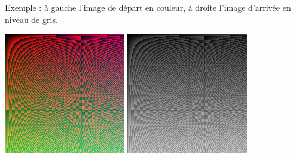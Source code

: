 \documentclass[11pt,class=report,crop=false]{standalone}
\begin{document}
\begin{activite}
\begin{enumerate}
Exemple : à gauche l'image de départ en couleur, à droite l'image d'arrivée en niveau de gris.
\begin{center}
\includegraphics[scale=\myscale,scale=0.5]{ecran-image_coul}\qquad\qquad
\includegraphics[scale=\myscale,scale=0.5]{ecran-image_coul_gris}
\end{center} 


\end{enumerate}   
     
\end{activite}


\end{document}
